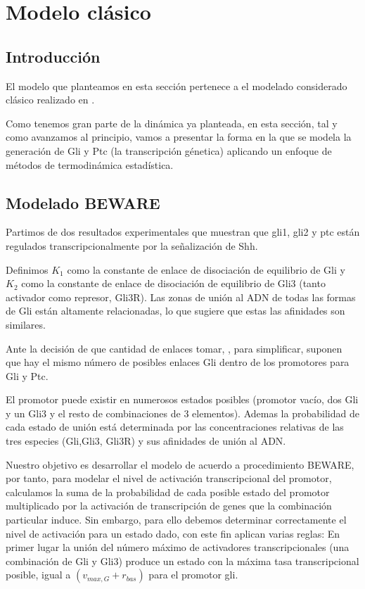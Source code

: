 
\chapter{Modelo clásico}

\label{ch:modelo_clasico}

\section{Introducción}
El modelo que planteamos en esta sección pertenece a el modelado considerado clásico realizado en \cite{schaffer}.

Como tenemos gran parte de la dinámica ya planteada, en esta sección, tal y como avanzamos al principio, vamos a presentar la forma en la que se modela la generación de Gli y Ptc (la transcripción génetica) aplicando un enfoque de métodos de termodinámica estadística.

\section{Modelado BEWARE}
 
 
 
 Partimos de dos resultados experimentales que muestran que gli1, gli2 y ptc están regulados transcripcionalmente por la señalización de Shh.
 
  Definimos $K_1$ como la constante de enlace de disociación de equilibrio de Gli y $K_2$ como la constante de enlace de disociación de equilibrio de Gli3 (tanto activador como represor, Gli3R). Las zonas de unión al ADN de todas las formas de Gli están altamente relacionadas, lo que sugiere que estas las afinidades son similares.
  
  Ante la decisión de que cantidad de enlaces tomar, \cite{schaffer}, para simplificar, suponen que hay el mismo número de posibles enlaces Gli dentro de los
  promotores para Gli y Ptc.
  
  
  El promotor puede existir en numerosos
  estados posibles (promotor vacío, dos Gli  y un Gli3 y el resto de combinaciones de 3 elementos). Ademas la probabilidad de cada estado de unión está determinada por las concentraciones relativas de las tres especies (Gli,Gli3, Gli3R) y sus afinidades de unión al ADN. 
  
  
  Nuestro objetivo es desarrollar el modelo de acuerdo a procedimiento BEWARE, por tanto, para modelar el nivel de activación transcripcional del promotor, calculamos la suma de la probabilidad de cada posible estado del promotor multiplicado por la activación de transcripción de genes que la combinación particular
  induce.
  Sin embargo, para ello debemos determinar correctamente  el nivel de activación para un estado dado, con este fin \cite{schaffer,saha} aplican varias reglas:
  En primer lugar la unión del número máximo de activadores transcripcionales (una combinación de Gli y Gli3) produce un estado con la máxima tasa transcripcional  posible, igual a $(v_{max,G} + r_{bas})$ para el promotor gli.
  
